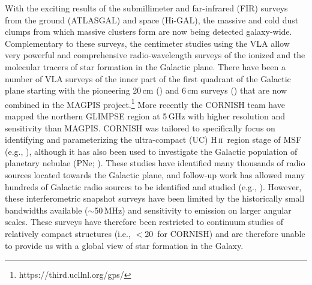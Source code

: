 \documentclass{aa}
\DeclareRobustCommand{\ion}[2]{\textup{#1\,\textsc{\lowercase{#2}}}}
\newcommand{\hii}{\ion{H}{ii}}
\begin{document}
With the exciting results of the submillimeter and far-infrared (FIR) surveys from the ground (ATLASGAL) and space (Hi-GAL), the massive and cold dust clumps from which massive clusters form are now being  detected galaxy-wide. Complementary to these surveys, the centimeter studies using the VLA allow very powerful and comprehensive radio-wavelength surveys of  the ionized and the molecular tracers of star formation in the Galactic plane. There have been a number of VLA surveys of  the inner part of the first quadrant of the Galactic plane starting with the pioneering 20\,cm (\citealt{Becker1990}) and 6\,cm surveys (\citealt{becker1994}) that are now combined in the MAGPIS project.\footnote{https://third.ucllnl.org/gps/} More recently the CORNISH team have mapped the northern GLIMPSE region at 5\,GHz with  higher resolution and sensitivity than MAGPIS. CORNISH was tailored to specifically  focus on identifying and  parameterizing the ultra-compact (UC) \hii\ region stage of MSF (e.g., \citealt{PurcellHoareCotton2013, kalcheva2018}), although it has also been used to investigate the Galactic population of planetary nebulae (PNe; \citealt{irabor2018}). These studies have identified many thousands of radio sources located towards the Galactic plane, and follow-up work has allowed many hundreds of Galactic radio sources to be identified and studied (e.g., \citealt{urquhart2013_cornish, cesaroni2015,kalcheva2018, irabor2018}). However, these interferometric snapshot surveys have been limited by the historically small bandwidths available ($\sim$50\,MHz) and sensitivity to emission on larger angular scales. These surveys have therefore been restricted to continuum studies of relatively compact structures (i.e., $<$20\arcsec\ for CORNISH) and are therefore unable to provide us with a global view of star formation in the Galaxy.
 
\end{document}

